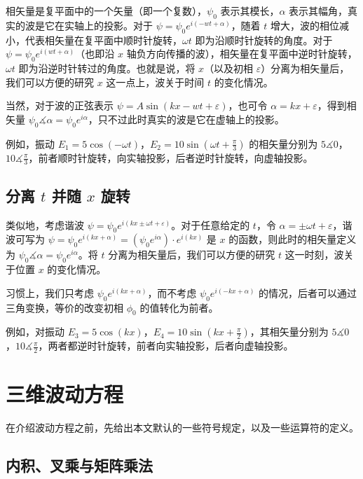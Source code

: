 \documentclass[UTF8]{report}
\theoremstyle{MyLineTheoremStyle} %
\theoremstyle{MyBlockTheoremStyle} %
\theoremstyle{MySubsubsectionStyle} %
\begin{document}
相矢量是复平面中的一个矢量（即一个复数），$\psi_0$ 表示其模长，$\alpha$ 表示其幅角，真实的波是它在实轴上的投影。对于 $\psi = \psi_0 e^{i(- wt + \alpha)} $，随着 $t$ 增大，波的相位减小，代表相矢量在复平面中顺时针旋转，$\omega t$ 即为沿顺时针旋转的角度。对于 $\psi = \psi_0 e^{i( wt + \alpha)}$（也即沿 $x$ 轴负方向传播的波），相矢量在复平面中逆时针旋转，$\omega t$ 即为沿逆时针转过的角度。也就是说，将 $x$（以及初相 $\varepsilon$）分离为相矢量后，我们可以方便的研究 $x$ 这一点上，波关于时间 $t$ 的变化情况。

当然，对于波的正弦表示 $\psi = A \sin (kx - wt + \varepsilon)$，也可令  $\alpha = kx + \varepsilon$，得到相矢量 $\psi_0 \measuredangle \alpha = \psi_0 e^{i \alpha}$，只不过此时真实的波是它在虚轴上的投影。

例如，振动 $E_1 = 5 \cos (-\omega t)$，$E_2 = 10 \sin (\omega t + \frac{\pi}{3} )$ 的相矢量分别为 $5 \measuredangle 0$，$10 \measuredangle \frac{\pi}{3} $，前者顺时针旋转，向实轴投影，后者逆时针旋转，向虚轴投影。

\subsection{分离 $t$ 并随 $x$ 旋转}

类似地，考虑谐波 $\psi = \psi_0 e^{i(kx \pm \omega t + \varepsilon)}$。对于任意给定的 $t$，令 $\alpha = \pm \omega t + \varepsilon$，谐波可写为 $\psi = \psi_0 e^{i(kx + \alpha)} = (\psi_0 e^{i \alpha})\cdot e^{i(kx)} $ 是 $x$ 的函数，则此时的相矢量定义为 $ \psi_0 \measuredangle \alpha = \psi_0 e^{i \alpha}$。将 $t$ 分离为相矢量后，我们可以方便的研究 $t$ 这一时刻，波关于位置 $x$ 的变化情况。

习惯上，我们只考虑 $\psi_0 e^{i(kx + \alpha)}$，而不考虑 $\psi_0 e^{i(-kx + \alpha)}$ 的情况，后者可以通过三角变换，等价的改变初相 $\phi_0$ 的值转化为前者。 

例如，对振动 $E_3 = 5 \cos (kx)$，$E_4 = 10 \sin (kx + \frac{\pi}{2} )$，其相矢量分别为 $5 \measuredangle 0$，$10 \measuredangle \frac{\pi}{2} $，两者都逆时针旋转，前者向实轴投影，后者向虚轴投影。



\section{三维波动方程}\label{波动方程}

在介绍波动方程之前，先给出本文默认的一些符号规定，以及一些运算符的定义。

\subsection{内积、叉乘与矩阵乘法}
\end{document}
